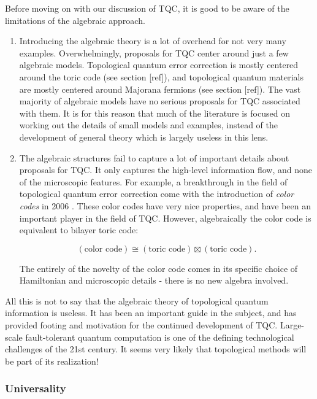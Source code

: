 \documentclass{article}
\theoremstyle{definition}
\numberwithin{figure}{section}
\begin{document}
Before moving on with our discussion of TQC, it is good to be aware of the limitations of the algebraic approach.

\begin{enumerate}
\item Introducing the algebraic theory is a lot of overhead for not very many examples. Overwhelmingly, proposals for TQC center around just a few algebraic models. Topological quantum error correction is mostly centered around the toric code (see section [ref]), and topological quantum materials are mostly centered around Majorana fermions (see section [ref]). The vast majority of algebraic models have no serious proposals for TQC associated with them. It is for this reason that much of the literature is focused on working out the details of small models and examples, instead of the development of general theory which is largely useless in this lens.

\item The algebraic structures fail to capture a lot of important details about proposals for TQC. It only captures the high-level information flow, and none of the microscopic features. For example, a breakthrough in the field of topological quantum error correction come with the introduction of \textit{color codes} in 2006 \cite{bombin2006topological}. These color codes have very nice properties, and have been an important player in the field of TQC. However, algebraically the color code is equivalent to bilayer toric code:

$$(\text{color code})\cong (\text{toric code})\boxtimes (\text{toric code}).$$

The entirely of the novelty of the color code comes in its specific choice of Hamiltonian and microscopic details - there is no new algebra involved.

\end{enumerate}

All this is not to say that the algebraic theory of topological quantum information is useless. It has been an important guide in the subject, and has provided footing and motivation for the continued development of TQC. Large-scale fault-tolerant quantum computation is one of the defining technological challenges of the 21st century. It seems very likely that topological methods will be part of its realization!

\subsubsection{Universality}
\end{document}
